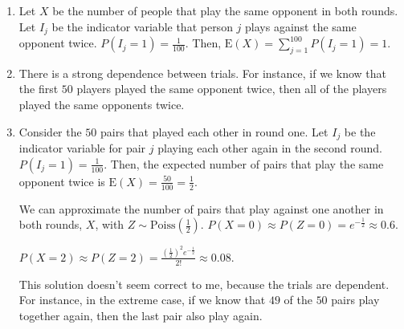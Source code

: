 \begin{enumerate}[label=(\alph*)]
\item Let $X$ be the number of people that play the same opponent in both
rounds. Let $I_{j}$ be the indicator variable that person $j$ plays against the
same opponent twice. $P(I_{j}=1) = \frac{1}{100}$. Then, $\text{E}(X) = \sum_
{j=1}^{100}P(I_{j}=1) = 1$.

\item There is a strong dependence between trials. For instance, if we know that
the first $50$ players played the same opponent twice, then all of the players
played the same opponents twice.

\item Consider the $50$ pairs that played each other in round one. Let $I_{j}$
be the indicator variable for pair $j$ playing each other again in the second
round. $P(I_{j}=1) = \frac{1}{100}$. Then, the expected number of pairs that
play the same opponent twice is $\text{E}(X) = \frac{50}{100} = \frac{1}{2}$.

We can approximate the number of pairs that play against one another in both
rounds, $X$,  with $Z \sim \text{Poiss}(\frac{1}{2})$. $P(X = 0) \approx P(Z =
0) = e^{-\frac{1}{2}} \approx 0.6$.

$P(X = 2) \approx P(Z = 2) = \frac{(\frac{1}{2})^{2}e^{-\frac{1}{2}}}{2!}
\approx 0.08$.

This solution doesn't seem correct to me, because the trials are dependent. For
instance, in the extreme case, if we know that $49$ of the $50$ pairs play
together again, then the last pair also play again.
\end{enumerate}